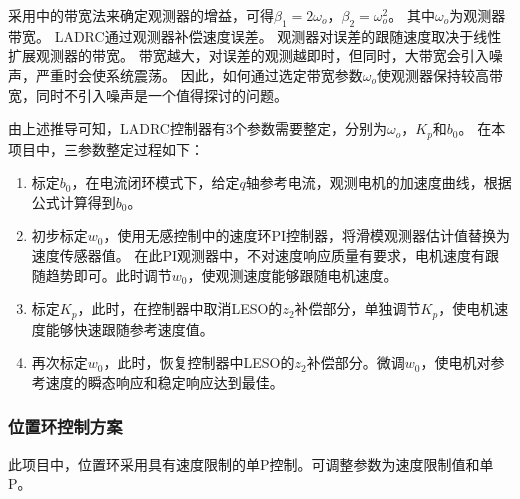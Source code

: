 ﻿\documentclass[12pt,a4paper]{article}
\begin{document}
采用\cite{zhiqiang_gao_scaling_2003}中的带宽法来确定观测器的增益，可得$\beta_1=2\omega_o$，$\beta_2=\omega_o^2$。
其中$\omega_o$为观测器带宽。
LADRC通过观测器补偿速度误差。
观测器对误差的跟随速度取决于线性扩展观测器的带宽。
带宽越大，对误差的观测越即时，但同时，大带宽会引入噪声，严重时会使系统震荡。
因此，如何通过选定带宽参数$\omega_o$使观测器保持较高带宽，同时不引入噪声是一个值得探讨的问题。

由上述推导可知，LADRC控制器有3个参数需要整定，分别为$\omega_o$，$K_p$和$b_0$。
在本项目中，三参数整定过程如下：
\begin{enumerate}
  \item 标定$b_0$，在电流闭环模式下，给定$q$轴参考电流，观测电机的加速度曲线，根据公式计算得到$b_0$。
  \item 初步标定$w_0$，使用无感控制中的速度环PI控制器，将滑模观测器估计值替换为速度传感器值。
        在此PI观测器中，不对速度响应质量有要求，电机速度有跟随趋势即可。此时调节$w_0$，使观测速度能够跟随电机速度。
  \item 标定$K_p$，此时，在控制器中取消LESO的$z_2$补偿部分，单独调节$K_p$，使电机速度能够快速跟随参考速度值。
  \item 再次标定$w_0$，此时，恢复控制器中LESO的$z_2$补偿部分。微调$w_0$，使电机对参考速度的瞬态响应和稳定响应达到最佳。
\end{enumerate}


\subsubsection{位置环控制方案}
此项目中，位置环采用具有速度限制的单P控制。可调整参数为速度限制值和单P。
\end{document}
